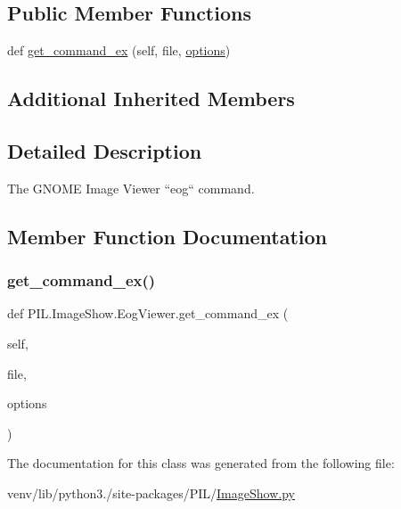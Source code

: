 \subsection*{Public Member Functions}
\begin{DoxyCompactItemize}
\item 
def \hyperlink{classPIL_1_1ImageShow_1_1EogViewer_a6224a53e764d53a8fd652e70c12b57ca}{get\+\_\+command\+\_\+ex} (self, file, \hyperlink{classPIL_1_1ImageShow_1_1UnixViewer_afbac95ff1c2d0ab0858163dd7e80671e}{options})
\end{DoxyCompactItemize}
\subsection*{Additional Inherited Members}


\subsection{Detailed Description}
\begin{DoxyVerb}The GNOME Image Viewer ``eog`` command.\end{DoxyVerb}
 

\subsection{Member Function Documentation}
\mbox{\label{classPIL_1_1ImageShow_1_1EogViewer_a6224a53e764d53a8fd652e70c12b57ca}} 
\subsubsection{\texorpdfstring{get\+\_\+command\+\_\+ex()}{get\_command\_ex()}}
{\footnotesize\ttfamily def P\+I\+L.\+Image\+Show.\+Eog\+Viewer.\+get\+\_\+command\+\_\+ex (\begin{DoxyParamCaption}\item[{}]{self,  }\item[{}]{file,  }\item[{}]{options }\end{DoxyParamCaption})}



The documentation for this class was generated from the following file\+:\begin{DoxyCompactItemize}
\item 
venv/lib/python3./site-\/packages/\+P\+I\+L/\hyperlink{ImageShow_8py}{Image\+Show.\+py}\end{DoxyCompactItemize}
